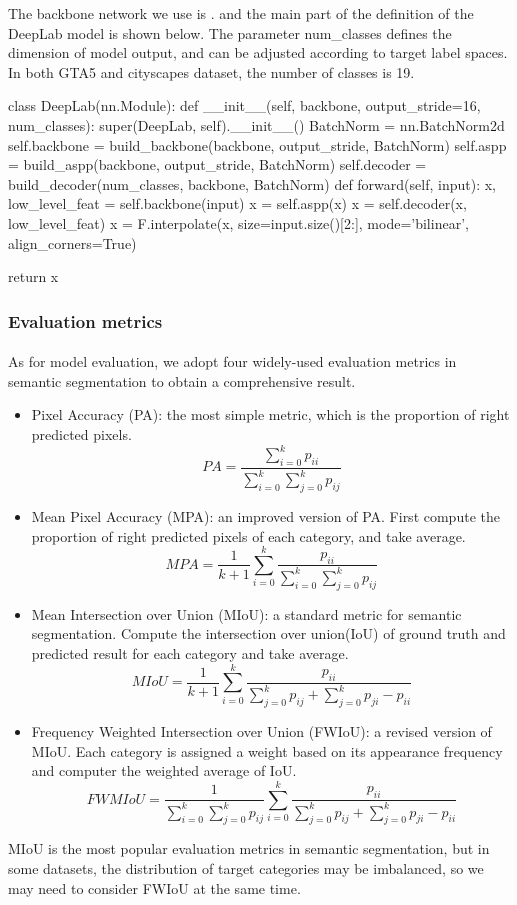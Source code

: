 The backbone network we use is . and the main part of the definition of the  DeepLab model is shown below. The parameter num\_classes defines the dimension of model output, and can be adjusted according to target label spaces. In both GTA5 and cityscapes dataset, the number of classes is 19.
\begin{python}
class DeepLab(nn.Module):
    def __init__(self, backbone, output_stride=16, num_classes):
        super(DeepLab, self).__init__()
        BatchNorm = nn.BatchNorm2d
        self.backbone = build_backbone(backbone, output_stride, BatchNorm)
        self.aspp = build_aspp(backbone, output_stride, BatchNorm)
        self.decoder = build_decoder(num_classes, backbone, BatchNorm)
    def forward(self, input):
        x, low_level_feat = self.backbone(input)
        x = self.aspp(x)
        x = self.decoder(x, low_level_feat)
        x = F.interpolate(x, size=input.size()[2:], mode='bilinear', align_corners=True)

        return x
\end{python}
\subsubsection{Evaluation metrics}
\paragraph{}
As for model evaluation, we adopt four widely-used evaluation metrics in semantic segmentation to obtain a comprehensive result.
\begin{itemize}
    \item Pixel Accuracy (PA): the most simple metric, which is the proportion of right predicted pixels. \[PA = \frac{\sum_{i=0}^k{p_{ii}}}{\sum_{i=0}^k\sum_{j=0}^k{p_{ij}}}\] 
    \item Mean Pixel Accuracy (MPA): an improved version of PA. First compute the proportion of right predicted pixels of each category, and take average. \[MPA = \frac{1}{k+1}\sum_{i=0}^k\frac{p_{ii}}{\sum_{i=0}^k\sum_{j=0}^k{p_{ij}}}\] 
    \item Mean Intersection over Union (MIoU): a standard metric for semantic segmentation. Compute the intersection over union(IoU) of ground truth and predicted result for each category and take average. \[MIoU = \frac{1}{k+1}\sum_{i=0}^k\frac{{p_{ii}}}{\sum_{j=0}^k{p_{ij}}+\sum_{j=0}^k{p_{ji}}-p_{ii}}\]
    \item Frequency Weighted Intersection over Union (FWIoU): a revised version of MIoU. Each category is assigned a weight based on its appearance frequency and computer the weighted average of IoU. \[FWMIoU = \frac{1}{\sum_{i=0}^k\sum_{j=0}^k{p_{ij}}}\sum_{i=0}^k\frac{{p_{ii}}}{\sum_{j=0}^k{p_{ij}}+\sum_{j=0}^k{p_{ji}}-p_{ii}}\]
\end{itemize}
MIoU is the most popular evaluation metrics in semantic segmentation, but in some datasets, the distribution of target categories may be imbalanced, so we may need to consider FWIoU at the same time.
